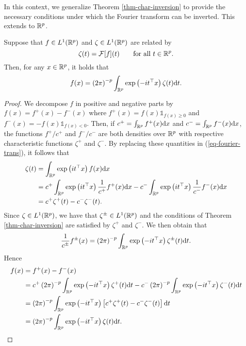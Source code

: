 In this context, we generalize Theorem \ref{thm-char-inversion} to provide the necessary conditions under which the Fourier transform can be inverted. This extends \cite[Corollary 2.4.3]{kolassa2006series} to ${\mathbb{R}^p}$.

\begin{corollary} \label{corr-fourier-inv}
    Suppose that $f \in L^1({\mathbb{R}^p})$ and $\zeta \in L^1({\mathbb{R}^p})$ are related by
    \begin{equation}\label{eq-fourier-trans}
        \zeta(t) = \mathcal{F}[f](t) \ \ \ \ \ \ {\textrm{for all }} t \in {\mathbb{R}^p}.
    \end{equation}
    Then, for any $x \in {\mathbb{R}^p}$, it holds that
    \begin{equation} \label{eq-fourier-inv}
        f(x) = \left(2\pi\right)^{-p}\int_{\mathbb{R}^p} \exp\left(-i t^\top x\right) \zeta(t) \text{d} t.
    \end{equation}
\end{corollary}

\begin{proof}
    We decompose $f$ in positive and negative parts by $f(x) = f^+(x) - f^-(x)$ where $f^+(x) = f(x) \mathbb{1}_{f(x) \geq 0}$ and $f^-(x) = -f(x) \mathbb{1}_{f(x) < 0}$. Then, if $c^+ = \int_{\mathbb{R}^p} f^+(x) \text{d} x$ and $c^- = \int_{\mathbb{R}^p} f^-(x) \text{d} x$, the functions $f^+ / c^+$ and $f^- / c^-$ are both densities over ${\mathbb{R}^p}$ with respective characteristic functions $\zeta^+$ and $\zeta^-$. By replacing these quantities in (\ref{eq-fourier-trans}), it follows that
    \begin{align*}
        \zeta(t) 
        &= \int_{\mathbb{R}^p} \exp\left(it^\top x\right)f(x)\text{d} x \\
        &= c^+ \int_{\mathbb{R}^p} \exp\left(it^\top x\right) \frac{1}{c^+}f^+(x)\text{d} x - c^- \int_{\mathbb{R}^p} \exp\left(it^\top x\right) \frac{1}{c^-}f^-(x)\text{d} x\\
        &= c^+ \zeta^+(t) - c^-\zeta^-(t).
    \end{align*}
    Since $\zeta \in L^1({\mathbb{R}^p})$, we have that $\zeta^\pm \in L^1({\mathbb{R}^p})$ and the conditions of Theorem \ref{thm-char-inversion} are satisfied by $\zeta^+$ and $\zeta^-$. We then obtain that
    \begin{equation*}
        \frac{1}{c^\pm} f^\pm(x) = \left(2\pi\right)^{-p}\int_{\mathbb{R}^p} \exp\left(-i t^\top x\right) \zeta^\pm(t) \text{d} t.
    \end{equation*}
    Hence
    \begin{align*}
        f(x) 
        &= f^+(x) - f^-(x) \\
        &= c^+ \left(2\pi\right)^{-p}\int_{\mathbb{R}^p} \exp\left(-i t^\top x\right) \zeta^+(t) \text{d} t
         - c^- \left(2\pi\right)^{-p}\int_{\mathbb{R}^p} \exp\left(-i t^\top x\right) \zeta^-(t) \text{d} t \\
        &= \left(2\pi\right)^{-p}\int_{\mathbb{R}^p} \exp\left(-i t^\top x\right) \left[ c^+\zeta^+(t) - c^-\zeta^-(t)\right] \text{d} t\\
        &= \left(2\pi\right)^{-p}\int_{\mathbb{R}^p} \exp\left(-i t^\top x\right) \zeta(t) \text{d} t. \qedhere
    \end{align*}
\end{proof}

